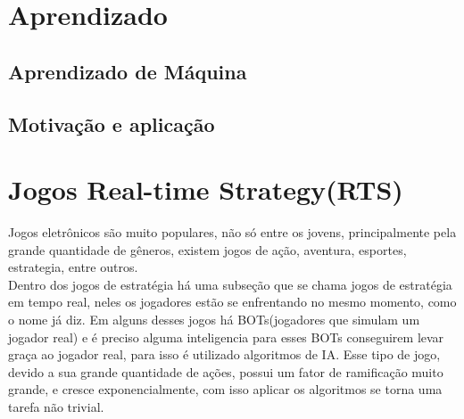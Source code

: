 \section{Aprendizado} 

\subsection{Aprendizado de Máquina} 


\subsection{Motivação e aplicação}


\section{Jogos Real-time Strategy(RTS)} 

Jogos eletrônicos são muito populares, não só entre os jovens, principalmente pela grande quantidade de gêneros, existem jogos de ação, aventura, esportes, estrategia, entre outros. \\
Dentro dos jogos de estratégia há uma subseção que se chama jogos de estratégia em tempo real, neles os jogadores estão se enfrentando no mesmo momento, como o nome já diz. Em alguns desses jogos há BOTs(jogadores que simulam um jogador real) e é preciso alguma inteligencia para esses BOTs conseguirem levar graça ao jogador real, para isso é utilizado algoritmos de IA. Esse tipo de jogo, devido a sua grande quantidade de ações, possui um fator de ramificação muito grande, e cresce exponencialmente, com isso aplicar os algoritmos se torna uma tarefa não trivial.  \\
